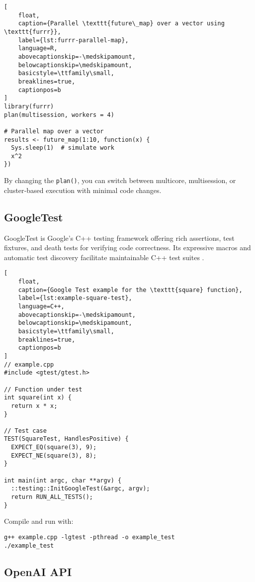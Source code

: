 \begin{lstlisting}[
    float,
    caption={Parallel \texttt{future\_map} over a vector using \texttt{furrr}},
    label={lst:furrr-parallel-map},
    language=R,
    abovecaptionskip=-\medskipamount,
    belowcaptionskip=\medskipamount,
    basicstyle=\ttfamily\small,
    breaklines=true,
    captionpos=b
]
library(furrr)
plan(multisession, workers = 4)

# Parallel map over a vector
results <- future_map(1:10, function(x) {
  Sys.sleep(1)  # simulate work
  x^2
})
\end{lstlisting}


By changing the \texttt{plan()}, you can switch between multicore, multisession, or cluster‐based execution with minimal code changes.

\subsection{GoogleTest}

GoogleTest is Google’s C++ testing framework offering rich assertions, test fixtures, and death tests for verifying code correctness. Its expressive macros and automatic test discovery facilitate maintainable C++ test suites \cite{google2023gtest}.

\begin{lstlisting}[
    float,
    caption={Google Test example for the \texttt{square} function},
    label={lst:example-square-test},
    language=C++,
    abovecaptionskip=-\medskipamount,
    belowcaptionskip=\medskipamount,
    basicstyle=\ttfamily\small,
    breaklines=true,
    captionpos=b
]
// example.cpp
#include <gtest/gtest.h>

// Function under test
int square(int x) {
  return x * x;
}

// Test case
TEST(SquareTest, HandlesPositive) {
  EXPECT_EQ(square(3), 9);
  EXPECT_NE(square(3), 8);
}

int main(int argc, char **argv) {
  ::testing::InitGoogleTest(&argc, argv);
  return RUN_ALL_TESTS();
}
\end{lstlisting}


Compile and run with:
\begin{verbatim}
g++ example.cpp -lgtest -pthread -o example_test
./example_test
\end{verbatim}

\subsection{OpenAI API}

